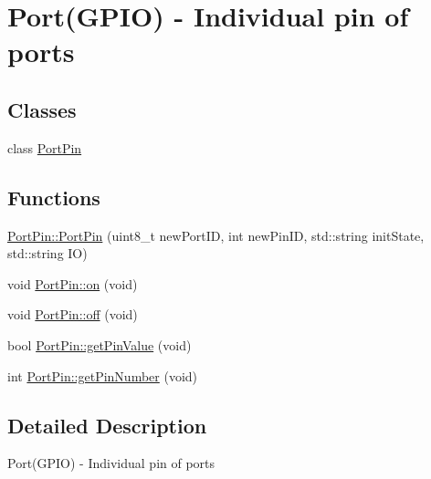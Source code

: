\hypertarget{group__group7}{
\section{Port(GPIO) -\/ Individual pin of ports}
\label{d2/d0a/group__group7}
}
\subsection*{Classes}
\begin{DoxyCompactItemize}
\item 
class \hyperlink{class_port_pin}{PortPin}
\end{DoxyCompactItemize}
\subsection*{Functions}
\begin{DoxyCompactItemize}
\item 
\hyperlink{group__group7_gadf30103fc0bc5b7dad6af1c7c4c0c1ab}{PortPin::PortPin} (uint8\_\-t newPortID, int newPinID, std::string initState, std::string IO)
\item 
void \hyperlink{group__group7_ga7dfeaef858c6fadac016106aac028278}{PortPin::on} (void)
\item 
void \hyperlink{group__group7_ga779ca8e89b76bff26659244a4e4888a7}{PortPin::off} (void)
\item 
bool \hyperlink{group__group7_gabc0f706193ead5769118388757374e85}{PortPin::getPinValue} (void)
\item 
int \hyperlink{group__group7_ga965a0cef4266fee8909e7b5998b1bae8}{PortPin::getPinNumber} (void)
\end{DoxyCompactItemize}


\subsection{Detailed Description}
Port(GPIO) -\/ Individual pin of ports 

